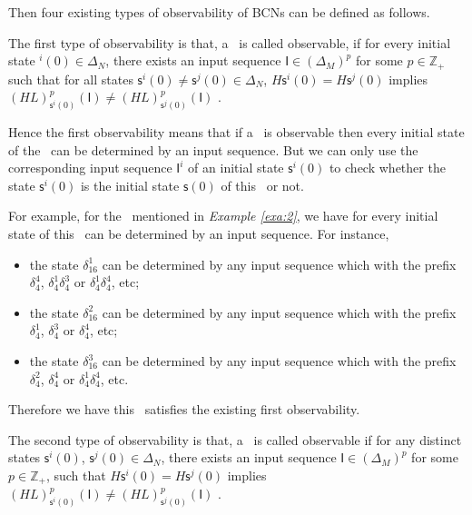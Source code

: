 Then four existing types of observability of BCNs can be defined as follows.
\begin{definition}
The first type of observability is that, a \BCN\ is called observable, if for every initial state \State$^{i}(0)$$\in \Delta_N$, there exists an input sequence $\mathsf{I}\in(\Delta_M)^p$ for some $p\in \mathbb{Z}_+$ such that for all states $\mathsf{s}^{i}(0)\neq \mathsf{s}^{j}(0)\in \Delta_N$, $H\mathsf{s}^{i}(0)=H\mathsf{s}^{j}(0)$ implies $(HL)^p_{\mathsf{s}^{i}(0)}(\mathsf{I})\neq (HL)^p_{{\mathsf{s}^{j}(0)}}(\mathsf{I})$ \cite{cheng2009controllability}.
\end{definition}

Hence the first observability means that if a \BCN\ is observable then every initial state of the \BCN\ can be determined by an input sequence. But we can only use the corresponding input sequence $\mathsf{I}^i$ of an initial state $\mathsf{s}^{i}(0)$ to check whether the state $\mathsf{s}^{i}(0)$ is the initial state $\mathsf{s}(0)$ of this \BCN\ or not.
\begin{example}
For example, for the \BCN\ mentioned in {\em Example \ref{exa:2}}, we have for every initial state of this \BCN\ can be determined by an input sequence.  For instance,
\begin{itemize}
  \item the state $\delta_{16}^1$ can be determined by any input sequence which with the prefix $\delta_{4}^4$, $\delta_{4}^1 \delta_{4}^3$ or $\delta_{4}^1 \delta_{4}^4$, etc;
  \item the state $\delta_{16}^2$ can be determined by any input sequence which with the prefix $\delta_{4}^1$, $\delta_{4}^3$ or $\delta_{4}^4$, etc;
  \item the state $\delta_{16}^3$ can be determined by any input sequence which with the prefix $\delta_{4}^2$, $\delta_{4}^4$ or $\delta_{4}^1 \delta_{4}^4$, etc.
\end{itemize} 

Therefore we have this \BCN\ satisfies the existing first observability.
\end{example}   

\begin{definition}
	The second type of observability is that, a \BCN\ is called observable if for any distinct states $\mathsf{s}^{i}(0)$, $\mathsf{s}^{j}(0) \in \Delta_N$, there exists an input sequence $\mathsf{I}\in(\Delta_M)^p$ for some $p\in \mathbb{Z}_+$, such that $H\mathsf{s}^{i}(0)=H\mathsf{s}^{j}(0)$ implies $(HL)^p_{\mathsf{s}^{i}(0)}(\mathsf{I})\neq (HL)^p_{\mathsf{s}^{j}(0)}(\mathsf{I})$ \cite{Zhao2010Input}.
\end{definition}

